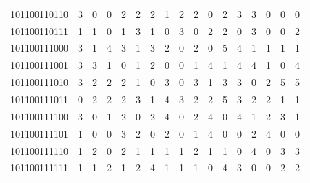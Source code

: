 \documentclass[10pt,a4paper]{article}
\begin{document}
\begin{longtable}{ |c|c|c|c|c|c|c|c|c|c|c|c|c|c|c|c|c| }
    101100110110              & 3                            & 0                                & 0                            & 2                              & 2   & 2   & 1   & 2   & 2   & 0   & 2   & 3   & 3   & 0   & 0   & 0   \\
    101100110111              & 1                            & 1                                & 0                            & 1                              & 3   & 1   & 0   & 3   & 0   & 2   & 2   & 0   & 3   & 0   & 0   & 2   \\
    101100111000              & 3                            & 1                                & 4                            & 3                              & 1   & 3   & 2   & 0   & 2   & 0   & 5   & 4   & 1   & 1   & 1   & 1   \\
    101100111001              & 3                            & 3                                & 1                            & 0                              & 1   & 2   & 0   & 0   & 1   & 4   & 1   & 4   & 4   & 1   & 0   & 4   \\
    101100111010              & 3                            & 2                                & 2                            & 2                              & 1   & 0   & 3   & 0   & 3   & 1   & 3   & 3   & 0   & 2   & 5   & 5   \\
    101100111011              & 0                            & 2                                & 2                            & 2                              & 3   & 1   & 4   & 3   & 2   & 2   & 5   & 3   & 2   & 2   & 1   & 1   \\
    101100111100              & 3                            & 0                                & 1                            & 2                              & 0   & 2   & 4   & 0   & 2   & 4   & 0   & 4   & 1   & 2   & 3   & 1   \\
    101100111101              & 1                            & 0                                & 0                            & 3                              & 2   & 0   & 2   & 0   & 1   & 4   & 0   & 0   & 2   & 4   & 0   & 0   \\
    101100111110              & 1                            & 2                                & 0                            & 2                              & 1   & 1   & 1   & 1   & 2   & 1   & 1   & 0   & 4   & 0   & 3   & 3   \\
    101100111111              & 1                            & 1                                & 2                            & 1                              & 2   & 4   & 1   & 1   & 1   & 0   & 4   & 3   & 0   & 0   & 2   & 2   \\

\end{longtable}
\end{document}
